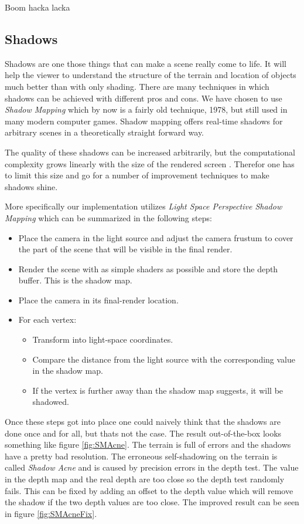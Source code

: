 Boom hacka lacka

\subsection{Shadows}
Shadows are one those things that can make a scene really come to life. It will help the viewer to understand the structure of the terrain and location of objects much better than with only shading. There are many techniques in which shadows can be achieved with different pros and cons. We have chosen to use \textit{Shadow Mapping} \cite{ShadowMapping} which by now is a fairly old technique, 1978, but still used in many modern computer games. Shadow mapping offers real-time shadows for arbitrary scenes in a theoretically straight forward way. 

The quality of these shadows can be increased arbitrarily, but the computational complexity grows linearly with the size of the rendered screen \cite{ShadowMapping}. Therefor one has to limit this size and go for a number of improvement techniques to make shadows shine. 

More specifically our implementation utilizes \textit{Light Space Perspective Shadow Mapping} \cite{LSPShadowMapping} which can be summarized in the following steps:

\begin{itemize}
\item Place the camera in the light source and adjust the camera frustum to cover the part of the scene that will be visible in the final render.
\item Render the scene with as simple shaders as possible and store the depth buffer. This is the shadow map.
\item Place the camera in its final-render location.
\item For each vertex:
\begin{itemize}
\item Transform into light-space coordinates.
\item Compare the distance from the light source with the corresponding value in the shadow map.
\item If the vertex is further away than the shadow map suggests, it will be shadowed. 
\end{itemize}
\end{itemize}

Once these steps got into place one could naively think that the shadows are done once and for all, but thats not the case. The result out-of-the-box looks something like figure \ref{fig:SMAcne}. The terrain is full of errors and the shadows have a pretty bad resolution. The erroneous self-shadowing on the terrain is called \textit{Shadow Acne} \cite{ImprovedShadowMapping} and is caused by precision errors in the depth test. The value in the depth map and the real depth are too close so the depth test randomly fails. This can be fixed by adding an offset to the depth value which will remove the shadow if the two depth values are too close. The improved result can be seen in figure \ref{fig:SMAcneFix}.

